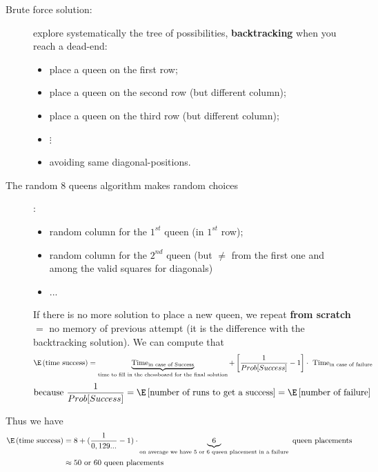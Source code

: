 \begin{description}
\item[Brute force solution: ] explore systematically the tree of possibilities, \textbf{backtracking} when you reach a dead-end:
\begin{itemize}
	\item place a queen on the first row;
	\item place a queen on the second row (but different column);
	\item place a queen on the third row (but different column);
	\item $\vdots$
	\item avoiding same diagonal-positions.
\end{itemize}
\item[The random 8 queens algorithm makes random choices]:\\
\begin{itemize}
	\item random column for the $1^{st}$ queen (in $1^{st}$ row);
	\item random column for the $2^{nd}$ queen (but $\neq$ from the first one and among the valid squares for diagonals)
	\item ...
\end{itemize}
If there is no more solution to place a new queen, we repeat \textbf{from scratch} $=$ no memory of previous attempt (it is the difference with the backtracking solution). We can compute that 
\begin{align*}
\E\left( \text{time success}\right)&=\underbrace{\text{Time}_{\text{in case of Success}}}_{\text{time to fill in the chessboard for the final solution}} + \left[\frac{1}{Prob[Success]}-1\right]\cdot \text{ Time}_{\text{in case of failure}}
\end{align*}
\begin{align*}
\text{because } \frac{1}{Prob[Success]}&=\E\left[\text{number of runs to get a success}\right]=\E\left[\text{number of failure}\right]
\end{align*}
\end{description}

Thus we have
\begin{align*}
\E\left( \text{time success}\right)&=8+(\frac{1}{0,129...}-1)\cdot \underbrace{6}_{\text{on average we have 5 or 6 queen placement in a failure}}\text{ queen placements}\\
&\approx 50\text{ or }60\text{ queen placements}
\end{align*}

